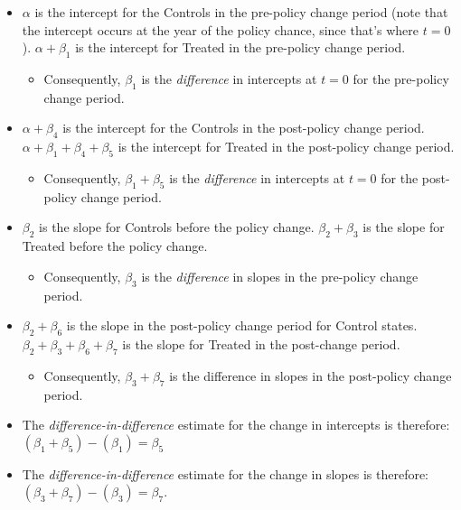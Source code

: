 \documentclass[12pt]{article}
\begin{document}
\begin{itemize}
  \item $\alpha$ is the intercept for the Controls in the pre-policy change period (note that the intercept occurs at the year of the policy chance, since that's where $t=0$).
  $\alpha + \beta_{1}$ is the intercept for Treated in the pre-policy change period.
  \begin{itemize}
    \item Consequently, $\beta_1$ is the \emph{difference} in intercepts at $t=0$ for the pre-policy change period.
  \end{itemize}
  \item $\alpha + \beta_4$ is the intercept for the Controls in the post-policy change period. $\alpha + \beta_1 + \beta_4 + \beta_5$ is the intercept for Treated in the post-policy change period.
  \begin{itemize}
    \item Consequently, $\beta_1 + \beta_5$ is the \emph{difference} in intercepts at $t=0$ for the post-policy change period.
  \end{itemize}
  \item $\beta_2$ is the slope for Controls before the policy change. $\beta_2 + \beta_3$ is the slope for Treated before the policy change.
\begin{itemize}
  \item Consequently, $\beta_{3}$ is the \emph{difference} in slopes in the pre-policy change period.
\end{itemize}
  \item $\beta_{2} + \beta_{6}$ is the slope in the post-policy change period for Control states. $\beta_{2} + \beta_{3} + \beta_{6} + \beta_{7}$ is the slope for Treated in the post-change period.
  \begin{itemize}
    \item Consequently, $\beta_{3} + \beta_{7}$ is the difference in slopes in the post-policy change period.
  \end{itemize}
  \item The \emph{difference-in-difference} estimate for the change in intercepts is therefore: \\
   $(\beta_1 + \beta_5) - (\beta_1) = \beta_5$
  \item The \emph{difference-in-difference} estimate for the change in slopes is therefore:\\
   $(\beta_{3} + \beta_{7}) - (\beta_{3}) = \beta_7$.
\end{itemize}
\end{document}
